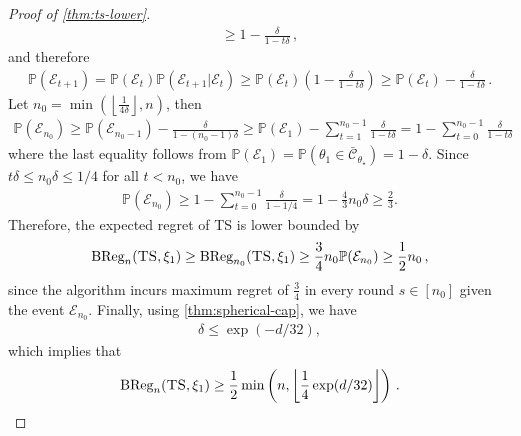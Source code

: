 \documentclass[letter, 12pt]{report}
\newcommand{\floor}[1]{\left\lfloor #1 \right\rfloor}
\newcommand{\BReg}{\textrm{BReg}}
\newcommand{\paren}[1]{\left( #1 \right)}
\newcommand{\cC}{\mathcal C}
\newcommand{\1}{\mathbf{1}}
\newcommand{\mP}{\mathbb{P}}
\newcommand{\ts}{\textsc{TS}\xspace}
\theoremstyle{plain}
\theoremstyle{definition}
\theoremstyle{remark}
\begin{document}
\begin{proof}[Proof of \cref{thm:ts-lower}]
\begin{align*}
        \geq
        1 - \frac{
            \delta
        }{
            1 - t \delta
        }
        \,,
    \end{align*}
    and therefore
    \begin{align*}
        \mP(\mathcal{E}_{t+1})
        =
        \mP\paren{
            \mathcal{E}_t
        }
        \mP\paren{
            \mathcal{E}_{t+1} | \mathcal{E}_t
        }
        \geq
        \mP\paren{
            \mathcal{E}_t
        }
        \paren{
            1
            - \frac{
                \delta
            }{
                1 - t \delta
            }
        }
        \geq
        \mP\paren{
            \mathcal{E}_t
        }
        - \frac{
            \delta
        }{
            1 - t \delta
        }\,.
    \end{align*}
    Let $n_0 = \min(\floor{\frac{1}{4\delta}}, n)$,
    then
    \begin{align*}
        \mP(
        \mathcal{E}_{n_0}
        )
        \geq
        \mP(
        \mathcal{E}_{n_0 - 1}
        )
        - \frac{
            \delta
        }{
            1 - (n_0-1) \delta
        }
        \geq
        \mP(
        \mathcal{E}_{1}
        )
        - \sum_{t=1}^{n_0-1}
        \frac{
            \delta
        }{
            1 - t \delta
        }
        =
        1
        -
        \sum_{t=0}^{n_0-1}
        \frac{
            \delta
        }{
            1 - t \delta
        }
    \end{align*}
    where the last equality follows from
    $\mP(\mathcal{E}_1) = \mP(\theta_1 \in \bar{\cC}_{\theta_\star}) = 1-\delta$.
    Since $t\delta \leq n_0\delta \leq 1/4$ for all $t < n_0$, we have
    \begin{align*}
        \mP(\mathcal{E}_{n_0})
        \geq
        1
        -
        \sum_{t=0}^{n_0-1}
        \frac{
            \delta
        }{
            1 - 1/4
        }
        =
        1
        -
        \frac{4}{3}
        n_0
        \delta
        \geq
        \frac23.
    \end{align*}
    Therefore, the expected regret of \ts{} is lower bounded by
    \begin{align*}
        \BReg_n(\ts, \xi_1) \geq
        \BReg_{n_0}(\ts, \xi_1) \geq
        \frac{3}{4} n_0 \mP(\mathcal{E}_{n_0})
        \geq
        \frac{1}{2} n_0\,,
    \end{align*}
    since the algorithm incurs maximum regret of $\frac34$
    in every round $s \in [n_0]$
    given the event $\mathcal{E}_{n_0}$.
    Finally, using \cref{thm:spherical-cap}, we have
    \begin{align*}
        \delta \leq \exp(-d/32),
    \end{align*}
    which implies that
    \begin{align*}
        \BReg_n(\ts, \xi_1) \geq
        \frac{1}{2}
        \min\paren{n, \floor{\frac14\exp(d/32)}}\,.
    \end{align*}
\end{proof}
\end{document}
